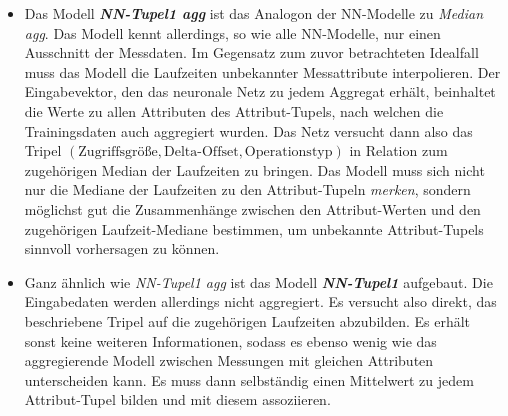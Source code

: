 \documentclass[
	12pt,
	a4paper,
	BCOR10mm,
	DIV14,
	listof=totoc,
	bibliography=totoc,
	headsepline
]{scrreprt}
\begin{document}
\begin{itemize}
	\item Das Modell \textit{\textbf{NN-Tupel1 agg}} ist das Analogon der NN-Modelle zu \textit{Median agg}. Das Modell kennt allerdings, so wie alle NN-Modelle, nur einen Ausschnitt der Messdaten.
	Im Gegensatz zum zuvor betrachteten Idealfall muss das Modell die Laufzeiten unbekannter Messattribute interpolieren.
	Der Eingabevektor, den das neuronale Netz zu jedem Aggregat erhält, beinhaltet die Werte zu allen Attributen des Attribut-Tupels, nach welchen die Trainingsdaten auch aggregiert wurden.
	Das Netz versucht dann also das Tripel $(\mbox{Zugriffsgröße}, \mbox{Delta-Offset}, \mbox{Operationstyp})$ in Relation zum zugehörigen Median der Laufzeiten zu bringen.
	Das Modell muss sich nicht nur die Mediane der Laufzeiten zu den Attribut-Tupeln \textit{merken}, sondern möglichst gut die Zusammenhänge zwischen den Attribut-Werten und den zugehörigen Laufzeit-Mediane bestimmen, um unbekannte Attribut-Tupels sinnvoll vorhersagen zu können.
	\item Ganz ähnlich wie \textit{NN-Tupel1 agg} ist das Modell \textit{\textbf{NN-Tupel1}} aufgebaut. Die Eingabedaten werden allerdings nicht aggregiert.
	Es versucht also direkt, das beschriebene Tripel auf die zugehörigen Laufzeiten abzubilden. Es erhält sonst keine weiteren Informationen, sodass es ebenso wenig wie das aggregierende Modell zwischen Messungen mit gleichen Attributen unterscheiden kann.
	Es muss dann selbständig einen Mittelwert zu jedem Attribut-Tupel bilden und mit diesem assoziieren.
\end{itemize}
\end{document}
